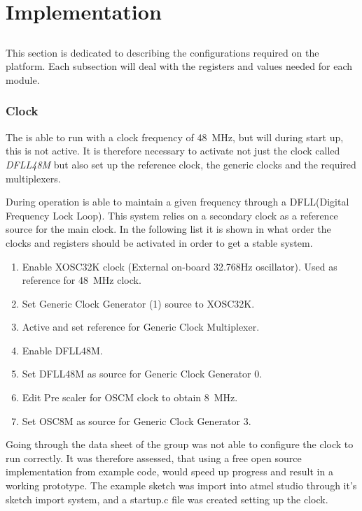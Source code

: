 
\chapter{Implementation}
\section{\SAMD}
This section is dedicated to describing the configurations required on the \SAMD platform. Each subsection will deal with the registers and values needed for each module.
\subsection{Clock}
The \SAMD is able to run with a clock frequency of \SI{48}{\mega\hertz}, but will during start up, this is not active. It is therefore necessary to activate not just the clock called \textit{DFLL48M} but also set up the reference clock, the generic clocks and the required multiplexers.

During operation \SAMD is able to maintain a given frequency through a DFLL(Digital Frequency Lock Loop).
This system relies on a secondary clock as a reference source for the main clock.
In the following list it is shown in what order the clocks and registers should be activated in order to get a stable system.

\begin{enumerate}
	\item Enable XOSC32K clock (External on-board 32.768Hz oscillator). Used as reference for \SI{48}{\mega\hertz} clock.
	\item Set Generic Clock Generator (1) source to XOSC32K.
	\item Active and set reference for Generic Clock Multiplexer.
	\item Enable DFLL48M.
	\item Set DFLL48M as source for Generic Clock Generator 0.
	\item Edit Pre scaler for OSCM clock to obtain \SI{8}{\mega\hertz}.
	\item Set OSC8M as source for Generic Clock Generator 3.
\end{enumerate} 

Going through the data sheet of \SAMD the group was not able to configure the clock to run correctly. It was therefore assessed, that using a free open source implementation from example code\cite{MKR1400GIT}, would speed up progress and result in a working prototype. The example sketch was import into atmel studio through it's sketch import system, and a startup.c file was created setting up the clock.

